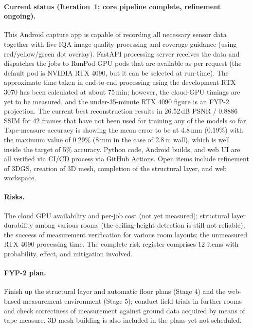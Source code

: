 \paragraph{Current status (Iteration~1: core pipeline complete, refinement ongoing).} This Android capture app is capable of recording all necessary sensor data together with live IQA image quality processing and coverage guidance (using red/yellow/green dot overlay). FastAPI processing server receives the data and dispatches the jobs to RunPod GPU pods that are available as per request (the default pod is NVIDIA RTX 4090, but it can be selected at run-time). The approximate time taken in end-to-end processing using the development RTX 3070 has been calculated at about 75\,min; however, the cloud-GPU timings are yet to be measured, and the under-35-minute RTX 4090 figure is an FYP-2 projection. The current best reconstruction results in 26.52\,dB PSNR / 0.8886 SSIM for 42 frames that have not been used for training any of the models so far. Tape-measure accuracy is showing the mean error to be at 4.8\,mm (0.19\%) with the maximum value of 0.29\% (8\,mm in the case of 2.8\,m wall), which is well inside the target of 5\% accuracy. Python code, Android builds, and web UI are all verified via CI/CD process via GitHub Actions. Open items include refinement of 3DGS, creation of 3D mesh, completion of the structural layer, and web workspace.

\paragraph{Risks.} The cloud GPU availability and per-job cost (not yet measured); structural layer durability among various rooms (the ceiling-height detection is still not reliable); the success of measurement verification for various room layouts; the unmeasured RTX 4090 processing time. The complete risk register comprises 12 items with probability, effect, and mitigation involved.

\paragraph{FYP-2 plan.} Finish up the structural layer and automatic floor plans (Stage 4) and the web-based measurement environment (Stage 5); conduct field trials in further rooms and check correctness of measurement against ground data acquired by means of tape measure. 3D mesh building is also included in the plans yet not scheduled.
